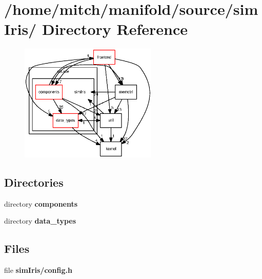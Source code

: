 \section{/home/mitch/manifold/source/simIris/ Directory Reference}
\label{dir_961f21cf278f00a88e2efd7330bb0d8a}


\nopagebreak
\begin{figure}[H]
\begin{center}
\leavevmode
\includegraphics[width=185pt]{dir_961f21cf278f00a88e2efd7330bb0d8a_dep}
\end{center}
\end{figure}
\subsection*{Directories}
\begin{CompactItemize}
\item 
directory {\bf components}
\item 
directory {\bf data\_\-types}
\end{CompactItemize}
\subsection*{Files}
\begin{CompactItemize}
\item 
file {\bf simIris/config.h}
\end{CompactItemize}
